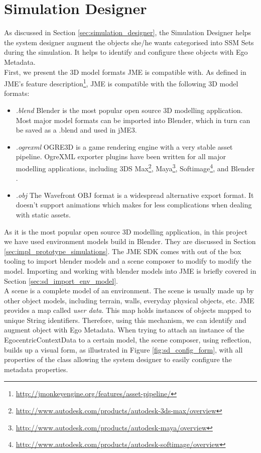 \section{Simulation Designer} %
\label{sec:impl_simulation_designer}
As discussed in Section \ref{sec:simulation_designer}, the Simulation Designer helps the system designer augment the objects she/he wants categorised into SSM Sets during the simulation. It helps to identify and configure these objects with Ego Metadata.\\

First, we present the 3D model formats JME is compatible with. As defined in JME's feature description\footnote{\url{http://jmonkeyengine.org/features/asset-pipeline/}}, JME is compatible with the following 3D model formats:
\begin{itemize}
	\item \emph{.blend} Blender \cite{blender:online} is the most popular open source 3D modelling application. Most major model formats can be imported into Blender, which in turn can be saved as a .blend and used in jME3.
	\item \emph{.ogrexml} OGRE3D is a game rendering engine with a very stable asset pipeline. OgreXML exporter plugins have been written for all major modelling  applications, including 3DS Max\footnote{\url{http://www.autodesk.com/products/autodesk-3ds-max/overview}}, Maya\footnote{\url{http://www.autodesk.com/products/autodesk-maya/overview}}, Softimage\footnote{\url{http://www.autodesk.com/products/autodesk-softimage/overview}}, and Blender \cite{blender:online}.
	\item \emph{.obj} The Wavefront OBJ format is a widespread alternative export format. It doesn't support animations which makes for less complications when dealing with static assets.
\end{itemize}

As it is the most popular open source 3D modelling application, in this project we have used environment models build in Blender. They are discussed in Section \ref{sec:impl_prototype_simulations}. The JME SDK comes with out of the box tooling to import blender models and a scene composer to modify to modify the model. Importing and working with blender models into JME is briefly covered in Section \ref{sec:sd_import_env_model}.\\

A scene is a complete model of an environment. The scene is usually made up by other object models, including terrain, walls, everyday physical objects, etc. JME provides a map called \emph{user data}. This map holds instances of objects mapped to unique String identifiers. Therefore, using this mechanism, we can identify and augment object with Ego Metadata. When trying to attach an instance of the EgocentricContextData to a certain model, the scene composer, using reflection, builds up a visual form, as illustrated in Figure \ref{fig:sd_config_form}, with all properties of the class allowing the system designer to easily configure the metadata properties.\\

